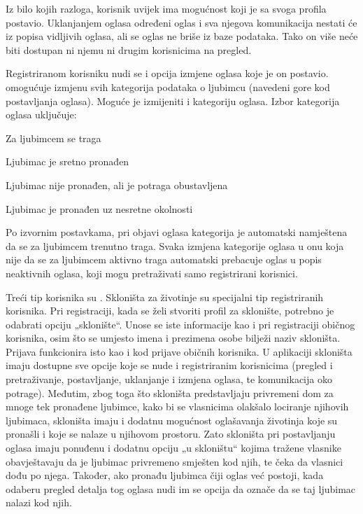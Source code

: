 		Iz bilo kojih razloga, korisnik uvijek ima mogućnost  koji je sa svoga profila postavio. Uklanjanjem oglasa određeni oglas i sva njegova komunikacija nestati će iz popisa vidljivih oglasa, ali se oglas ne briše iz baze podataka. Tako on više neće biti dostupan ni njemu ni drugim korisnicima na pregled.

Registriranom korisniku nudi se i opcija izmjene oglasa koje je on postavio.  omogućuje izmjenu svih kategorija podataka o ljubimcu (navedeni gore kod postavljanja oglasa). Moguće je izmijeniti i kategoriju oglasa. Izbor kategorija oglasa uključuje:

		\begin{packed_enum}
			
			\item  Za ljubimcem se traga
			\item  Ljubimac je sretno pronađen
			\item  Ljubimac nije pronađen, ali je potraga obustavljena
			\item  Ljubimac je pronađen uz nesretne okolnosti
			
		\end{packed_enum}

		Po izvornim postavkama, pri objavi oglasa kategorija je automatski namještena da se za ljubimcem trenutno traga. Svaka izmjena kategorije oglasa u onu koja nije da se za ljubimcem aktivno traga automatski prebacuje oglas u popis neaktivnih oglasa, koji mogu pretraživati samo registrirani korisnici. 

Treći tip korisnika su . Skloništa za životinje su specijalni tip registriranih korisnika. Pri registraciji, kada se želi stvoriti profil za sklonište, potrebno je odabrati opciju „sklonište“. Unose se iste informacije kao i pri registraciji običnog korisnika, osim što se umjesto imena i prezimena osobe bilježi naziv skloništa. Prijava funkcionira isto kao i kod prijave običnih korisnika. U aplikaciji skloništa imaju dostupne sve opcije koje se nude i registriranim korisnicima (pregled i pretraživanje, postavljanje, uklanjanje i izmjena oglasa, te komunikacija oko potrage). Međutim, zbog toga što skloništa predstavljaju privremeni dom za mnoge tek pronađene ljubimce, kako bi se vlasnicima olakšalo lociranje njihovih ljubimaca, skloništa imaju i dodatnu mogućnost oglašavanja životinja koje su pronašli i koje se nalaze u njihovom prostoru. Zato skloništa pri postavljanju oglasa imaju ponuđenu i dodatnu opciju „u skloništu“ kojima tražene vlasnike obavještavaju da je ljubimac privremeno smješten kod njih, te čeka da vlasnici dođu po njega. Također, ako pronađu ljubimca čiji oglas već postoji, kada odaberu pregled detalja tog oglasa nudi im se opcija da označe da se taj ljubimac nalazi kod njih.


